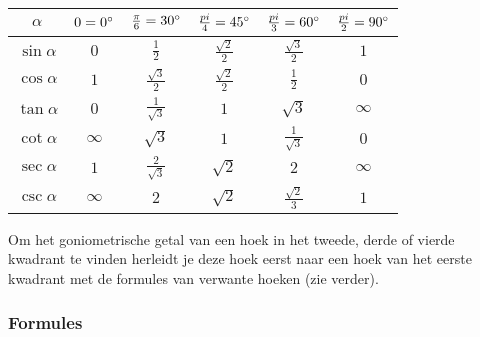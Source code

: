 \begin{center}
  \begin{tabular}{c|ccccc}
    $\alpha$ & $0=0^\circ$ & $\frac{\pi}{6}=30^\circ$ & $\frac{pi}{4}=45^\circ$ & $\frac{pi}{3}=60^\circ$ & $\frac{pi}{2}=90^\circ$\\
    \hline
    $\sin\alpha$ & $0$ & $\frac{1}{2}$ & $\frac{\sqrt{2}}{2}$ & $\frac{\sqrt{3}}{2}$ & $1$\\
    $\cos\alpha$ & $1$ & $\frac{\sqrt{3}}{2}$ & $\frac{\sqrt{2}}{2}$ & $\frac{1}{2}$ & $0$\\
    $\tan\alpha$ & $0$ & $\frac{1}{\sqrt{3}}$ & $1$ & $\sqrt{3}$ & $\infty$\\
    $\cot\alpha$ & $\infty$ & $\sqrt{3}$ & $1$ & $\frac{1}{\sqrt{3}}$ & $0$\\
    $\sec\alpha$ & $1$ & $\frac{2}{\sqrt{3}}$ & $\sqrt{2}$ & $2$ & $\infty$\\
    $\csc\alpha$ & $\infty$ & $2$ & $\sqrt{2}$ & $\frac{\sqrt{2}}{3}$ & $1$\\
  \end{tabular}
\end{center}

Om het goniometrische getal van een hoek in het tweede, derde of vierde kwadrant te vinden herleidt je deze hoek eerst naar een hoek van het eerste kwadrant met de formules van verwante hoeken (zie verder).

\subsubsection{Formules} \label{goniometrische_formules}
\hypertarget{goniometrische_formules}{}

